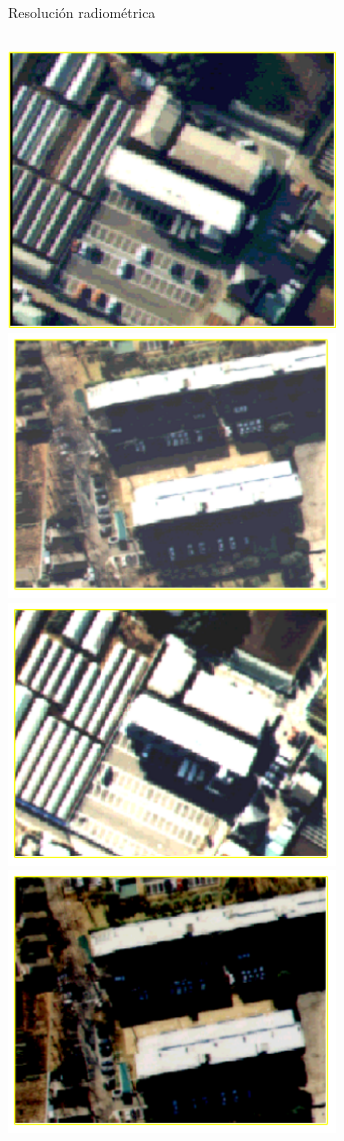 \documentclass{beamer}
\begin{document}
\begin{frame}{Resolución radiométrica}
		\begin{columns}
			\includegraphics[width=0.65\textwidth]{IMGs/rad_luz1}\\
			\includegraphics[width=0.65\textwidth]{IMGs/rad_dark1}
			\includegraphics[width=0.65\textwidth]{IMGs/rad_luz2}\\
			\includegraphics[width=0.65\textwidth]{IMGs/rad_dark2}
		\end{columns}
\end{frame}
\end{document}
